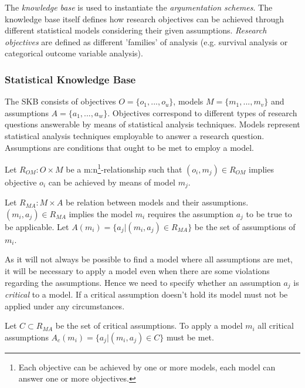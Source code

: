 The \textit{knowledge base} is used to instantiate the \textit{argumentation schemes}. The knowledge base itself defines how research objectives can be achieved through different statistical models considering their given assumptions. \textit{Research objectives} are defined as different 'families' of analysis (e.g. survival analysis or categorical outcome variable analysis).


\subsubsection*{Statistical Knowledge Base}


The \gls{SKB} consists of objectives $O=\{o_1, ..., o_u\}$, models $M=\{m_1, ..., m_v\}$ and assumptions $A = \{a_1, ..., a_w\}$. Objectives correspond to different types of research questions answerable by means of statistical analysis techniques. Models represent statistical analysis techniques employable to answer a research question. Assumptions are conditions that ought to be met to employ a model.
\begin{definition}
	Let $R_{OM}: O \times M$ be a m:n\footnote{Each objective can be achieved by one or more models, each model can answer one or more objectives.}-relationship such that $(o_i, m_j)\in R_{OM}$ implies objective $o_i$ can be achieved by means of model $m_j$. 
\end{definition}

\begin{definition}
	Let $R_{MA}: M \times A$ be relation between models and their assumptions. $(m_i, a_j)\in R_{MA}$ implies  the model $m_i$ requires the assumption $a_j$ to be true to be applicable. Let $A(m_i) = \{a_j | (m_i, a_j) \in R_{MA}\}$ be the set of assumptions of $m_i$.
\end{definition}

As it will not always be possible to find a model where all assumptions are met, it will be necessary to apply a model even when there are some violations regarding the assumptions. Hence we need to specify whether an assumption $a_j$ is \textit{critical} to a model. If a critical assumption doesn't hold its model must not be applied under any circumstances.

\begin{definition}
Let $C \subset R_{MA}$ be the set of critical assumptions. To apply a model $m_i$ all critical assumptions $A_c(m_i) = \{a_j | (m_i, a_j) \in C\}$ must be met.
\end{definition}


